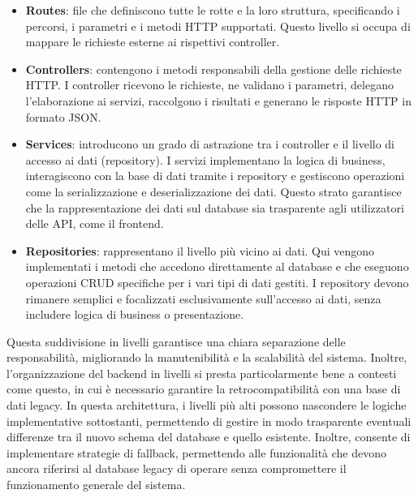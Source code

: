 \begin{itemize}
  \item \textbf{Routes}: file che definiscono tutte le rotte e la loro struttura, specificando i percorsi, i parametri e i metodi HTTP supportati. Questo livello si occupa di mappare le richieste esterne ai rispettivi controller.

  \item \textbf{Controllers}: contengono i metodi responsabili della gestione delle richieste HTTP. I controller ricevono le richieste, ne validano i parametri, delegano l'elaborazione ai servizi, raccolgono i risultati e generano le risposte HTTP in formato JSON.

  \item \textbf{Services}: introducono un grado di astrazione tra i controller e il livello di accesso ai dati (repository). I servizi implementano la logica di business, interagiscono con la base di dati tramite i repository e gestiscono operazioni come la serializzazione e deserializzazione dei dati. Questo strato garantisce che la rappresentazione dei dati sul database sia trasparente agli utilizzatori delle API, come il frontend.

  \item \textbf{Repositories}: rappresentano il livello più vicino ai dati. Qui vengono implementati i metodi che accedono direttamente al database e che eseguono operazioni CRUD specifiche per i vari tipi di dati gestiti. I repository devono rimanere semplici e focalizzati esclusivamente sull'accesso ai dati, senza includere logica di business o presentazione.
\end{itemize}

Questa suddivisione in livelli garantisce una chiara separazione delle responsabilità, migliorando la manutenibilità e la scalabilità del sistema. Inoltre, l'organizzazione del backend in livelli si presta particolarmente bene a contesti come questo, in cui è necessario garantire la retrocompatibilità con una base di dati legacy. In questa architettura, i livelli più alti possono nascondere le logiche implementative sottostanti, permettendo di gestire in modo trasparente eventuali differenze tra il nuovo schema del database e quello esistente. Inoltre, consente di implementare strategie di fallback, permettendo alle funzionalità che devono ancora riferirsi al database legacy di operare senza compromettere il funzionamento generale del sistema.
